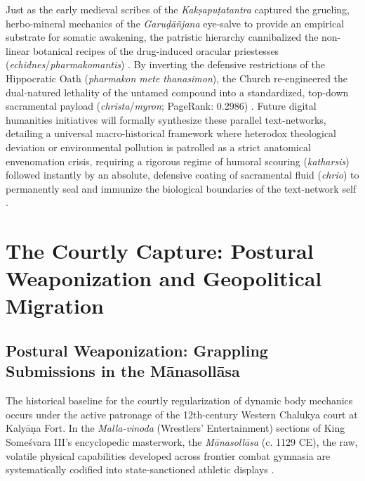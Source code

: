 \documentclass[11pt,twoside,letterpaper]{article}
\begin{document}
Just as the early medieval scribes of the \textit{Kak\d{s}apu\d{t}atantra} captured the grueling, herbo-mineral mechanics of the \textit{Garu\d{d}\={a}\~{n}jana} eye-salve to provide an empirical substrate for somatic awakening, the patristic hierarchy cannibalized the non-linear botanical recipes of the drug-induced oracular priestesses (\textit{echidnes}/\textit{pharmakomantis}) \citep{Wujastyk2025, McCartneyForthcomingDomingD}. By inverting the defensive restrictions of the Hippocratic Oath (\textit{pharmakon mete thanasimon}), the Church re-engineered the dual-natured lethality of the untamed compound into a standardized, top-down sacramental payload (\textit{christa}/\textit{myron}; PageRank: 0.2986) \citep{McCartneyForthcomingDomingD}. Future digital humanities initiatives will formally synthesize these parallel text-networks, detailing a universal macro-historical framework where heterodox theological deviation or environmental pollution is patrolled as a strict anatomical envenomation crisis, requiring a rigorous regime of humoral scouring (\textit{katharsis}) followed instantly by an absolute, defensive coating of sacramental fluid (\textit{chrio}) to permanently seal and immunize the biological boundaries of the text-network self \citep{McCartneyForthcomingDomingD}.

\section{The Courtly Capture: Postural Weaponization and Geopolitical Migration}

\subsection{Postural Weaponization: Grappling Submissions in the M\={a}nasoll\={a}sa}
The historical baseline for the courtly regularization of dynamic body mechanics occurs under the active patronage of the 12th-century Western Chalukya court at Kaly\={a}\d{n}a Fort. In the \textit{Malla-vinoda} (Wrestlers’ Entertainment) sections of King Some\'svara III’s encyclopedic masterwork, the \textit{M\={a}nasoll\={a}sa} (c. 1129 CE), the raw, volatile physical capabilities developed across frontier combat gymnasia are systematically codified into state-sanctioned athletic displays \citep{Man3}. 
\end{document}
